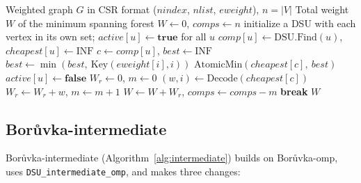 \documentclass[11pt,a4paper]{article}
\begin{document}
\begin{algorithm}[H]
  \caption{Bor\r{u}vka-omp}
  \label{alg:omp}
  \begin{algorithmic}[1]
    \Require Weighted graph $G$ in CSR format ($nindex$, $nlist$, $eweight$), $n = |V|$
    \Ensure Total weight $W$ of the minimum spanning forest
    \State $W \gets 0$, \; $comps \gets n$
    \State initialize a DSU with each vertex in its own set; $active[u] \gets \textbf{true}$ for all $u$
    \Loop
      \Statex {}
        \State $comp[u] \gets \text{DSU.Find}(u)$, \; $cheapest[u] \gets \text{INF}$
      \EndParFor
      \Statex {}
        \State $c \gets comp[u]$, \; $best \gets \text{INF}$
            \State $best \gets \min(best,\ \text{Key}(eweight[i], i))$ 
          \EndIf
        \EndFor
          \State $\text{AtomicMin}(cheapest[c],\ best)$ 
        \Else
          \State $active[u] \gets \textbf{false}$ 
        \EndIf
      \EndParFor
      \Statex {}
      \State $W_r \gets 0$, \; $m \gets 0$
          \State $(w, i) \gets \text{Decode}(cheapest[c])$
            \State $W_r \gets W_r + w$, \; $m \gets m + 1$
          \EndIf
        \EndIf
      \EndParFor
      \State $W \gets W + W_r$, \; $comps \gets comps - m$
        \State \textbf{break}
      \EndIf
    \EndLoop
    \State \Return $W$
  \end{algorithmic}
\end{algorithm}

\subsection*{Bor\r{u}vka-intermediate}
Bor\r{u}vka-intermediate (Algorithm~\ref{alg:intermediate}) builds on Bor\r{u}vka-omp, uses \texttt{DSU\_intermediate\_omp}, and makes three changes:
\end{document}
